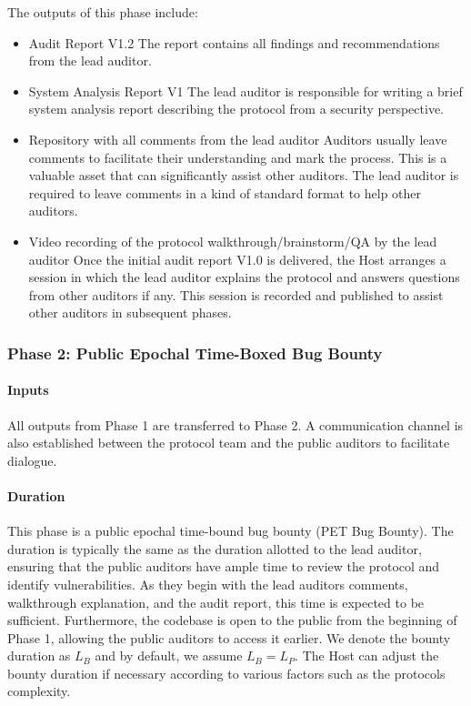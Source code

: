 \documentclass[10pt]{extarticle}
\def\tightlist{}
\begin{document}
The outputs of this phase include:

\begin{itemize}
\tightlist
\item
  Audit Report V1.2 The report contains all findings and recommendations
  from the lead auditor.
\item
  System Analysis Report V1 The lead auditor is responsible for writing
  a brief system analysis report describing the protocol from a security
  perspective.
\item
  Repository with all comments from the lead auditor Auditors usually
  leave comments to facilitate their understanding and mark the process.
  This is a valuable asset that can significantly assist other auditors.
  The lead auditor is required to leave comments in a kind of standard
  format to help other auditors.
\item
  Video recording of the protocol walkthrough/brainstorm/QA by the lead
  auditor Once the initial audit report V1.0 is delivered, the Host
  arranges a session in which the lead auditor explains the protocol and
  answers questions from other auditors if any. This session is recorded
  and published to assist other auditors in subsequent phases.
\end{itemize}

\subsubsection{ Phase 2: Public Epochal Time-Boxed Bug
Bounty}\label{432-phase-2-public-epochal-time-boxed-bug-bounty}

\paragraph{Inputs}\label{inputs-1}

All outputs from Phase 1 are transferred to Phase 2. A communication
channel is also established between the protocol team and the public
auditors to facilitate dialogue.

\paragraph{Duration}\label{duration-1}

This phase is a public epochal time-bound bug bounty (PET Bug Bounty).
The duration is typically the same as the duration allotted to the lead
auditor, ensuring that the public auditors have ample time to review the
protocol and identify vulnerabilities. As they begin with the lead
auditor\textquotesingle s comments, walkthrough explanation, and the
audit report, this time is expected to be sufficient. Furthermore, the
codebase is open to the public from the beginning of Phase 1, allowing
the public auditors to access it earlier. We denote the bounty duration
as \(L_B\) and by default, we assume \(L_B = L_P\). The Host can adjust
the bounty duration if necessary according to various factors such as
the protocol\textquotesingle s complexity.
\end{document}
